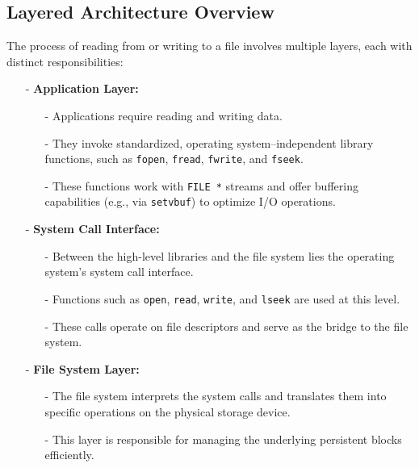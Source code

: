 \subsection{Layered Architecture Overview}
The process of reading from or writing to a file involves multiple layers, each with distinct responsibilities:\\[10px]
\noindent
\begin{minipage}{0.55\textwidth}
\begin{itemize}
    \item[-] \textbf{Application Layer:}
    \begin{itemize}
        \item[-] Applications require reading and writing data.
        \item[-] They invoke standardized, operating system–independent library functions, such as \verb|fopen|, \verb|fread|, \verb|fwrite|, and \verb|fseek|.
        \item[-] These functions work with \verb|FILE *| streams and offer buffering capabilities (e.g., via \verb|setvbuf|) to optimize I/O operations.
    \end{itemize}

    \item[-] \textbf{System Call Interface:}
    \begin{itemize}
        \item[-] Between the high-level libraries and the file system lies the operating system's system call interface.
        \item[-] Functions such as \verb|open|, \verb|read|, \verb|write|, and \verb|lseek| are used at this level.
        \item[-] These calls operate on file descriptors and serve as the bridge to the file system.
    \end{itemize}

    \item[-] \textbf{File System Layer:}
    \begin{itemize}
        \item[-] The file system interprets the system calls and translates them into specific operations on the physical storage device.
        \item[-] This layer is responsible for managing the underlying persistent blocks efficiently.
    \end{itemize}
\end{itemize}
\end{minipage}
\hfill

